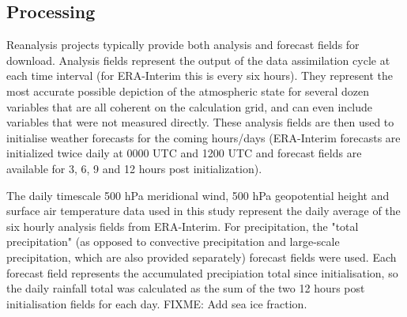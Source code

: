 \subsection{Processing}

Reanalysis projects typically provide both analysis and forecast fields for download. Analysis fields represent the output of the data assimilation cycle at each time interval (for ERA-Interim this is every six hours). They represent the most accurate possible depiction of the atmospheric state for several dozen variables that are all coherent on the calculation grid, and can even include variables that were not measured directly. These analysis fields are then used to initialise weather forecasts for the coming hours/days (ERA-Interim forecasts are initialized twice daily at 0000 UTC and 1200 UTC and forecast fields are available for 3, 6, 9 and 12 hours post initialization).  

The daily timescale 500 hPa meridional wind, 500 hPa geopotential height and surface air temperature data used in this study represent the daily average of the six hourly analysis fields from ERA-Interim. For precipitation, the "total precipitation" (as opposed to convective precipitation and large-scale precipitation, which are also provided separately)  forecast fields were used. Each forecast field represents the accumulated precipiation total since initialisation, so the daily rainfall total was calculated as the sum of the two 12 hours post initialisation fields for each day. FIXME: Add sea ice fraction.   